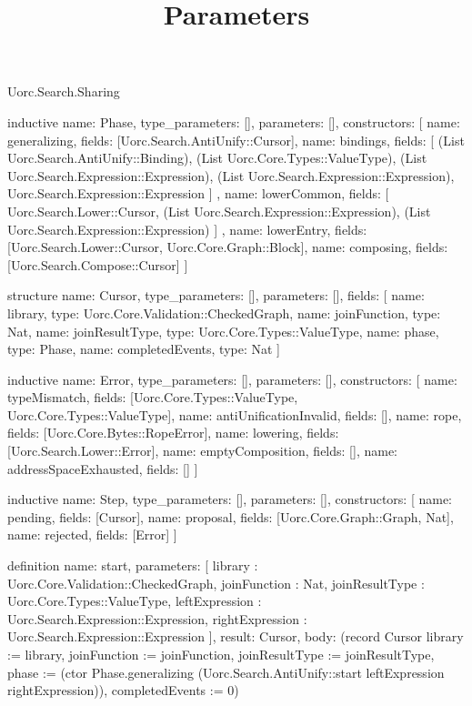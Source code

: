 \begin{lexlean}{Uorc.Search.Sharing}
\title{Parameters}
\begin{semanticmodule}
inductive{
  name: Phase,
  type_parameters: [],
  parameters: [],
  constructors: [
    {name: generalizing, fields: [Uorc.Search.AntiUnify::Cursor]},
    {
      name: bindings,
      fields: [
        (List Uorc.Search.AntiUnify::Binding),
        (List Uorc.Core.Types::ValueType),
        (List Uorc.Search.Expression::Expression),
        (List Uorc.Search.Expression::Expression),
        Uorc.Search.Expression::Expression
      ]
    },
    {
      name: lowerCommon,
      fields: [
        Uorc.Search.Lower::Cursor,
        (List Uorc.Search.Expression::Expression),
        (List Uorc.Search.Expression::Expression)
      ]
    },
    {name: lowerEntry, fields: [Uorc.Search.Lower::Cursor, Uorc.Core.Graph::Block]},
    {name: composing, fields: [Uorc.Search.Compose::Cursor]}
  ]
}

structure{
  name: Cursor,
  type_parameters: [],
  parameters: [],
  fields: [
    {name: library, type: Uorc.Core.Validation::CheckedGraph},
    {name: joinFunction, type: Nat},
    {name: joinResultType, type: Uorc.Core.Types::ValueType},
    {name: phase, type: Phase},
    {name: completedEvents, type: Nat}
  ]
}

inductive{
  name: Error,
  type_parameters: [],
  parameters: [],
  constructors: [
    {name: typeMismatch, fields: [Uorc.Core.Types::ValueType, Uorc.Core.Types::ValueType]},
    {name: antiUnificationInvalid, fields: []},
    {name: rope, fields: [Uorc.Core.Bytes::RopeError]},
    {name: lowering, fields: [Uorc.Search.Lower::Error]},
    {name: emptyComposition, fields: []},
    {name: addressSpaceExhausted, fields: []}
  ]
}

inductive{
  name: Step,
  type_parameters: [],
  parameters: [],
  constructors: [
    {name: pending, fields: [Cursor]},
    {name: proposal, fields: [Uorc.Core.Graph::Graph, Nat]},
    {name: rejected, fields: [Error]}
  ]
}

definition{
  name: start,
  parameters: [
    library : Uorc.Core.Validation::CheckedGraph,
    joinFunction : Nat,
    joinResultType : Uorc.Core.Types::ValueType,
    leftExpression : Uorc.Search.Expression::Expression,
    rightExpression : Uorc.Search.Expression::Expression
  ],
  result: Cursor,
  body: (record Cursor {library := library, joinFunction := joinFunction, joinResultType := joinResultType, phase := (ctor Phase.generalizing (Uorc.Search.AntiUnify::start leftExpression rightExpression)), completedEvents := 0})
}


\end{semanticmodule}
\end{lexlean}
